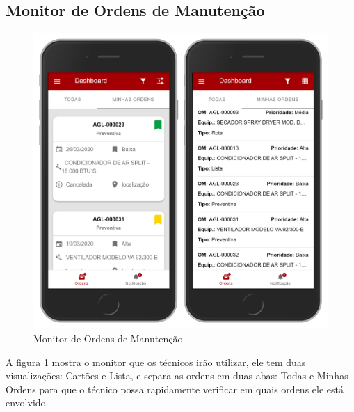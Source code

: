 \subsection{Monitor de Ordens de Manutenção}
\begin{figure}[H]
	\caption{\label{mobile-monitor}Monitor de Ordens de Manutenção}
	\begin{center}
		\includegraphics[scale=0.55]{./Figuras/agil.it/mobile-monitor.jpg}
	\end{center}
\end{figure}

A figura \ref{mobile-monitor} mostra o monitor que os técnicos irão utilizar, ele tem duas visualizações: Cartões e Lista, e separa as ordens em duas abas: Todas e Minhas Ordens para que o técnico possa rapidamente verificar em quais ordens ele está envolvido.

